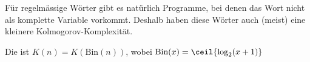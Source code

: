 \proven


Für regelmässige Wörter gibt es natürlich Programme, bei denen das Wort nicht als komplette Variable vorkommt. 
Deshalb haben diese Wörter auch (meist) eine kleinere Kolmogorov-Komplexität.


 Die  ist $K(n) = K(\text{Bin}(n))$,
wobei $\text{Bin}(x) = \ceil{\log_2(x + 1)}$ %
